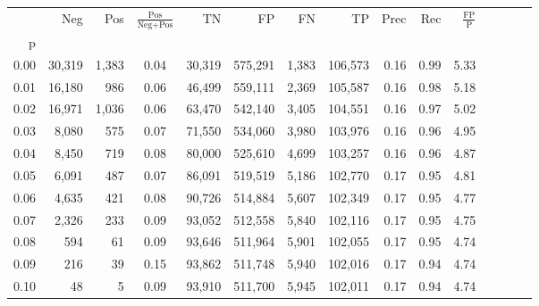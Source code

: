 \begin{tabular}{rrrcrrrrrrrrrrr}
\toprule
{} &     Neg &    Pos & $\frac{\text{Pos}}{\text{Neg}+\text{Pos}}$ &       TN &       FP &       FN &       TP &  Prec &   Rec & $\frac{\text{FP}}{\text{P}}$ \\
p    &         &        &                                            &          &          &          &          &       &       &                              \\
\midrule
0.00 &  30,319 &  1,383 &                                       0.04 &   30,319 &  575,291 &    1,383 &  106,573 &  0.16 &  0.99 &                         5.33 \\
0.01 &  16,180 &    986 &                                       0.06 &   46,499 &  559,111 &    2,369 &  105,587 &  0.16 &  0.98 &                         5.18 \\
0.02 &  16,971 &  1,036 &                                       0.06 &   63,470 &  542,140 &    3,405 &  104,551 &  0.16 &  0.97 &                         5.02 \\
0.03 &   8,080 &    575 &                                       0.07 &   71,550 &  534,060 &    3,980 &  103,976 &  0.16 &  0.96 &                         4.95 \\
0.04 &   8,450 &    719 &                                       0.08 &   80,000 &  525,610 &    4,699 &  103,257 &  0.16 &  0.96 &                         4.87 \\
0.05 &   6,091 &    487 &                                       0.07 &   86,091 &  519,519 &    5,186 &  102,770 &  0.17 &  0.95 &                         4.81 \\
0.06 &   4,635 &    421 &                                       0.08 &   90,726 &  514,884 &    5,607 &  102,349 &  0.17 &  0.95 &                         4.77 \\
0.07 &   2,326 &    233 &                                       0.09 &   93,052 &  512,558 &    5,840 &  102,116 &  0.17 &  0.95 &                         4.75 \\
0.08 &     594 &     61 &                                       0.09 &   93,646 &  511,964 &    5,901 &  102,055 &  0.17 &  0.95 &                         4.74 \\
0.09 &     216 &     39 &                                       0.15 &   93,862 &  511,748 &    5,940 &  102,016 &  0.17 &  0.94 &                         4.74 \\
0.10 &      48 &      5 &                                       0.09 &   93,910 &  511,700 &    5,945 &  102,011 &  0.17 &  0.94 &                         4.74 \\

\end{tabular}
